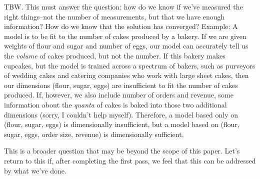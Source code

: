 {\color{red} TBW. This must answer the question: how do we know if we've measured the right things--not the number of measurements, but that we have enough information? How do we know that the solution has converged? Example: A model is to be fit to the number of cakes produced by a bakery. If we are given weights of flour and sugar and number of eggs, our model can accurately tell us the \emph{volume} of cakes produced, but not the number. If this bakery makes cupcakes, but the model is trained across a spectrum of bakers, such as purveyors of wedding cakes and catering companies who work with large sheet cakes, then our dimensions (flour, sugar, eggs) are insufficient to fit the number of cakes produced. If, however, we also include number of orders and revenue, some information about the \emph{quanta} of cakes is baked into those two additional dimensions (sorry, I couldn't help myself). Therefore, a model based only on (flour, sugar, eggs) is dimensionally insufficient, but a model based on (flour, sugar, eggs, order size, revenue) is dimensionally sufficient.

This is a broader question that may be beyond the scope of this paper. Let's return to this if, after completing the first pass, we feel that this can be addressed by what we've done.}



